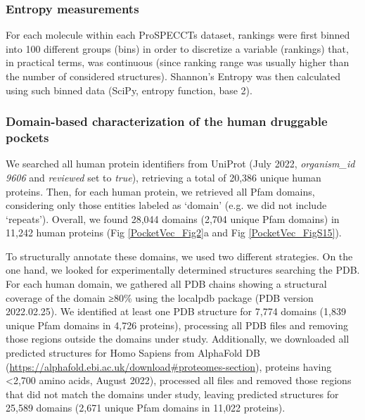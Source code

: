 \subsubsection{Entropy measurements}

For each molecule within each ProSPECCTs dataset, rankings were first binned into 100 different groups (bins) in order to discretize a variable (rankings) that, in practical terms, was continuous (since ranking range was usually higher than the number of considered structures). Shannon's Entropy was then calculated using such binned data (SciPy\cite{virtanen_scipy_2020}, entropy function, base 2).

\subsubsection{Domain-based characterization of the human druggable pockets}

We searched all human protein identifiers from UniProt (July 2022, \textit{organism\_id 9606} and \textit{reviewed} set to \textit{true}), retrieving a total of 20,386 unique human proteins\cite{the_uniprot_consortium_uniprot_2023}. Then, for each human protein, we retrieved all Pfam domains\cite{mistry_pfam_2021}, considering only those entities labeled as ‘domain’ (e.g. we did not include ‘repeats’). Overall, we found 28,044 domains (2,704 unique Pfam domains) in 11,242 human proteins (Fig \ref{PocketVec_Fig2}a and Fig \ref{PocketVec_FigS15}).

To structurally annotate these domains, we used two different strategies. On the one hand, we looked for experimentally determined structures searching the PDB\cite{goodsell_rcsb_2020}. For each human domain, we gathered all PDB chains showing a structural coverage of the domain ≥80\% using the localpdb package\cite{ludwiczak_localpdb_2022} (PDB version 2022.02.25). We identified at least one PDB structure for 7,774 domains (1,839 unique Pfam domains in 4,726 proteins), processing all PDB files and removing those regions outside the domains under study. Additionally, we downloaded all predicted structures for Homo Sapiens from AlphaFold DB (\hyperlink{https://alphafold.ebi.ac.uk/download\#proteomes-section}{https://alphafold.ebi.ac.uk/download\#proteomes-section}), proteins having <2,700 amino acids, August 2022), processed all files and removed those regions that did not match the domains under study, leaving predicted structures for 25,589 domains (2,671 unique Pfam domains in 11,022 proteins).

